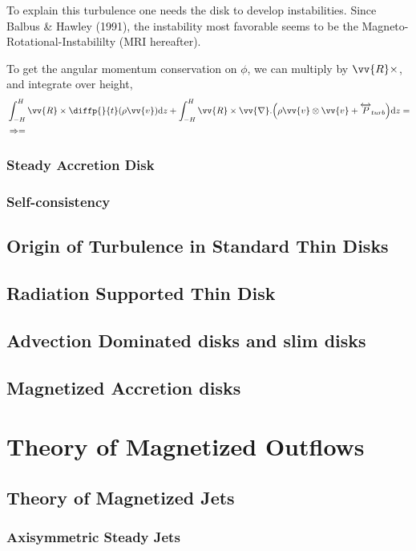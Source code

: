 \documentclass[10pt,a4paper,english,draft]{article}
\let\originalleft\left
\let\originalright\right
\renewcommand{\left}{\mathopen{}\mathclose\bgroup\originalleft}
\renewcommand{\right}{\aftergroup\egroup\originalright}
\begin{document}

To explain this turbulence one needs the disk to develop instabilities. Since
Balbus \& Hawley (1991), the instability most favorable seems to be the
Magneto-Rotational-Instabililty (MRI hereafter).


To get the angular momentum conservation on $\phi$, we can multiply by $\vv{R} \times$, and integrate over height,
\begin{align*}
    &\int_{-H}^H \vv{R} \times \diffp{}{t}(\rho \vv{v}) \d{z} + \int_{-H}^H \vv{R} \times \vv{\nabla}.\left(\rho \vv{v} \otimes \vv{v} + \tens{P}_{turb}\right) \d{z}
    = \\
    &\Rightarrow =
\end{align*}


\subsubsection{Steady Accretion Disk}
\subsubsection{Self-consistency}
\subsection{Origin of Turbulence in Standard Thin Disks}
\subsection{Radiation Supported Thin Disk}
\subsection{Advection Dominated disks and slim disks}
\subsection{Magnetized Accretion disks}

\section{Theory of Magnetized Outflows}
\subsection{Theory of Magnetized Jets}
\subsubsection{Axisymmetric Steady Jets}
\end{document}
